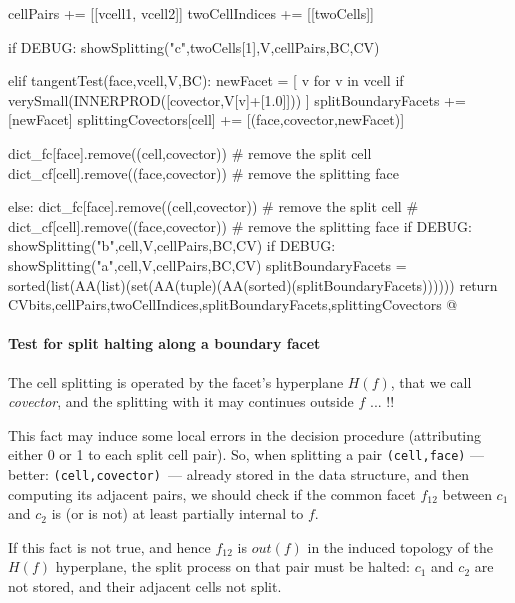 \documentclass[11pt,oneside]{article}	%
\begin{document}
{								cellPairs += [[vcell1, vcell2]]
								twoCellIndices += [[twoCells]]
												
					if DEBUG: showSplitting("c",twoCells[1],V,cellPairs,BC,CV)

				elif tangentTest(face,vcell,V,BC):										
					newFacet = [ v for v in vcell if 
						verySmall(INNERPROD([covector,V[v]+[1.0]])) ]
					splitBoundaryFacets += [newFacet]
					splittingCovectors[cell] += [(face,covector,newFacet)]
					
					dict_fc[face].remove((cell,covector))   # remove the split cell
					dict_cf[cell].remove((face,covector))   # remove the splitting face

				else: 
					dict_fc[face].remove((cell,covector))   # remove the split cell
					# dict_cf[cell].remove((face,covector))   # remove the splitting face
				if DEBUG: showSplitting("b",cell,V,cellPairs,BC,CV)
			if DEBUG: showSplitting("a",cell,V,cellPairs,BC,CV)
	splitBoundaryFacets = sorted(list(AA(list)(set(AA(tuple)(AA(sorted)(splitBoundaryFacets))))))
	return CVbits,cellPairs,twoCellIndices,splitBoundaryFacets,splittingCovectors
@}


\paragraph{Test for split halting along a boundary facet}

The cell splitting is operated by the facet's hyperplane $H(f)$, that we call \emph{covector},  and the splitting with it may continues outside $f$ ... !!

This fact may induce some local errors in the decision procedure (attributing either 0 or 1 to each split cell pair).
So, when splitting a pair \texttt{(cell,face)} --- better: \texttt{(cell,covector) }--- already stored in the data structure, and then computing its adjacent  pairs,
we should check if the common facet $f_{12}$ between $c_1$ and $c_2$ is (or is not) at least partially internal  to $f$.  

If this fact is not true, and hence $f_{12}$ is $out(f)$  in the induced topology of the $H(f)$ hyperplane, the split process on that pair must be halted:  $c_1$ and $c_2$ are not stored, and their adjacent cells not split.
\end{document}
